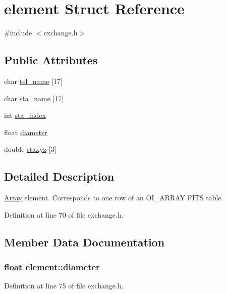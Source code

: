 \hypertarget{structelement}{
\section{element Struct Reference}
\label{structelement}
}


{\ttfamily \#include $<$exchange.h$>$}

\subsection*{Public Attributes}
\begin{DoxyCompactItemize}
\item 
char \hyperlink{structelement_abc9fbf0bf4d9887fcba546a087043250}{tel\_\-name} \mbox{[}17\mbox{]}
\item 
char \hyperlink{structelement_a0b7d84eae2238b598f638d5c1019643a}{sta\_\-name} \mbox{[}17\mbox{]}
\item 
int \hyperlink{structelement_af80efd6ab7b399cfcd749503e064d706}{sta\_\-index}
\item 
float \hyperlink{structelement_a353aad90574577e4105cabb00275f10b}{diameter}
\item 
double \hyperlink{structelement_a8cac52fbabbe9b450d82e65cfe8974ca}{staxyz} \mbox{[}3\mbox{]}
\end{DoxyCompactItemize}


\subsection{Detailed Description}
\hyperlink{classArray}{Array} element. Corresponds to one row of an OI\_\-ARRAY FITS table. 

Definition at line 70 of file exchange.h.



\subsection{Member Data Documentation}
\hypertarget{structelement_a353aad90574577e4105cabb00275f10b}{
\subsubsection[{diameter}]{\setlength{\rightskip}{0pt plus 5cm}float {\bf element::diameter}}}
\label{structelement_a353aad90574577e4105cabb00275f10b}


Definition at line 75 of file exchange.h.

